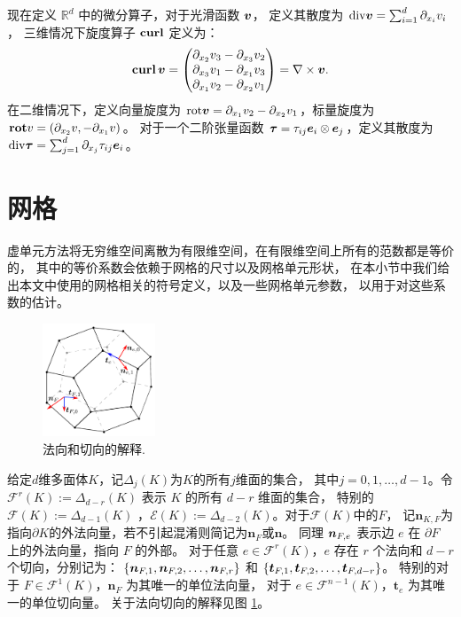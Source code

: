 现在定义 $\mathbb{R}^d$ 中的微分算子，对于光滑函数 $\boldsymbol{v}$，
定义其散度为 $\mathrm{div} \boldsymbol{v} = \sum_{i=1}^d \partial_{x_i}v_i$，
三维情况下旋度算子 $\operatorname{\textbf{curl}}$ 定义为：
$$
\operatorname{\textbf{curl}} \boldsymbol{v} = \begin{pmatrix}
    \partial_{x_2}v_3 - \partial_{x_3}v_2 \\
    \partial_{x_3}v_1 - \partial_{x_1}v_3 \\
    \partial_{x_1}v_2 - \partial_{x_2}v_1
\end{pmatrix} = \nabla \times \boldsymbol{v}.
$$
在二维情况下，定义向量旋度为 $\mathrm{rot} \boldsymbol{v} = \partial_{x_1}v_2 -
\partial_{x_2}v_1$，标量旋度为 $\mathbf{rot} v = (\partial_{x_2}v, -\partial_{x_1}v)$。
对于一个二阶张量函数 $\boldsymbol{\tau} = \tau_{ij}\boldsymbol{e}_i\otimes\boldsymbol{e}_j$，定义其散度为 
$\mathrm{div} \boldsymbol{\tau} = \sum_{j=1}^d \partial_{x_j}\tau_{ij} \boldsymbol{e}_i$。

\section{网格}
虚单元方法将无穷维空间离散为有限维空间，在有限维空间上所有的范数都是等价的，
其中的等价系数会依赖于网格的尺寸以及网格单元形状，
在本小节中我们给出本文中使用的网格相关的符号定义，以及一些网格单元参数，
以用于对这些系数的估计。

\begin{figure}[htbp]
    \centering
    \includegraphics[width=0.3\textwidth]{./figures/hmvem/polygon_normal_vector.pdf}
    \caption{法向和切向的解释.}
    \label{fig:notation}
\end{figure}


给定$d$维多面体$K$，记$\Delta_j(K)$为$K$的所有$j$维面的集合，
其中$j=0,1,\ldots, d-1$。令 $\mathcal{F}^r(K) := \Delta_{d-r}(K)$ 表示 $K$
的所有 $d-r$ 维面的集合，
特别的 $\mathcal{F}(K):=\Delta_{d-1}(K)$
，$\mathcal{E}(K):=\Delta_{d-2}(K)$。对于$\mathcal{F}(K)$中的$F$，
记$\boldsymbol{n}_{K,F}$为指向$\partial
K$的外法向量，若不引起混淆则简记为$\boldsymbol{n}_F$或$\boldsymbol{n}$。
同理 $\boldsymbol{n}_{F, e}$ 表示边 $e$ 在 $\partial F$ 上的外法向量，指向 $F$ 的外部。
对于任意 $e \in \mathcal{F}^r(K)$，$e$ 存在 $r$ 个法向和 $d-r$ 个切向，分别记为：
$\{\boldsymbol{n}_{F, 1}, \boldsymbol{n}_{F, 2}, \ldots, \boldsymbol{n}_{F, r}\}$ 和 $\{\boldsymbol{t}_{F, 1}, \boldsymbol{t}_{F, 2},
\ldots, \boldsymbol{t}_{F, d-r}\}$。
特别的对于 $F\in\mathcal{F}^1(K)$，$\boldsymbol{n}_F$ 为其唯一的单位法向量，
对于 $e \in \mathcal{F}^{n-1}(K)$，$\boldsymbol{t}_e$ 为其唯一的单位切向量。
关于法向切向的解释见图 \ref{fig:notation}。

